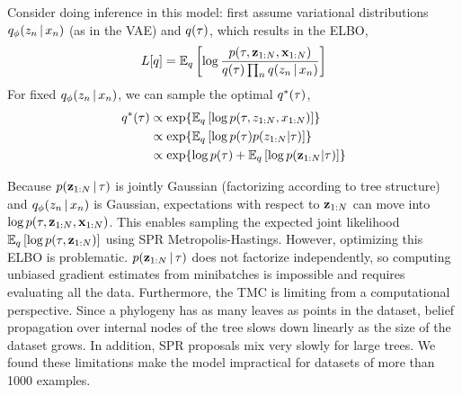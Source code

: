 Consider doing inference in this model:
first assume variational distributions 
$q_\phi(z_n \,|\, x_n)$ (as in the VAE)
and $q(\tau)$, which results in the
ELBO,
\begin{equation}
    \begin{split}
    L[q] &= \mathbb{E}_q\left[\log \frac{p(\tau, \mathbf{z}_{1:N}, \mathbf{x}_{1:N})}{q(\tau)\prod_n q(z_n \,|\, x_n)}\right] \\
    \end{split}
\end{equation}
For fixed $q_\phi(z_n \,|\, x_n)$, we can
sample the optimal $q^*(\tau)$,
\begin{equation}
    \begin{split}
    \q^*(\tree) &\propto \exp{\E_\q\left[\log \p(\tree, z_{1:N}, x_{1:N})\right]} \\
              &\propto \exp{\E_\q\left[\log \p(\tree)\p(z_{1:N}|\tree)\right]} \\
              &\propto \exp{\log \p(\tree) + \E_\q\left[\log \p(\latentdata|\tree)\right]}
    \end{split}
\end{equation}
\begin{equation}
    \begin{split}
    \end{split}
\end{equation}
Because $p(\mathbf{z}_{1:N} \,|\, \tau)$ is jointly Gaussian (factorizing
according to tree structure) and $q_\phi(z_n \,|\, x_n)$ is Gaussian, 
expectations with respect to $\mathbf{z}_{1:N}$
can move into $\log p(\tau, \mathbf{z}_{1:N}, \mathbf{x}_{1:N})$. This
enables sampling the expected joint likelihood $\mathbb{E}_q\left[\log p(\tau, \mathbf{z}_{1:N})\right]$
using SPR Metropolis-Hastings.
However, optimizing this ELBO is problematic.
$p(\mathbf{z}_{1:N} \,|\, \tau)$
does not factorize independently, so computing
unbiased gradient estimates from minibatches is impossible
and requires evaluating all the data.
Furthermore, the TMC is limiting
from a computational perspective.
Since a phylogeny has as many leaves
as points in the dataset, 
belief propagation over internal nodes
of the tree slows down linearly as 
the size of the dataset grows.
In addition,
SPR proposals mix very slowly for large trees.
We found these limitations 
make the model impractical for datasets
of more than 1000 examples.

